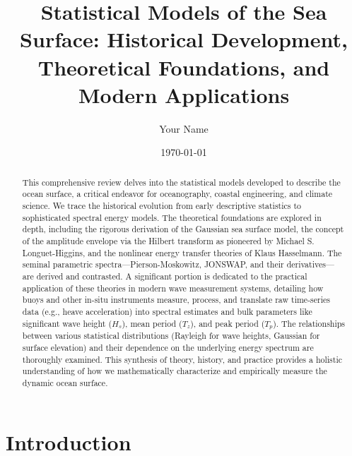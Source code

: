 \documentclass[12pt]{article}
\title{Statistical Models of the Sea Surface: Historical Development, Theoretical Foundations, and Modern Applications}
\author{Your Name}
\date{\today}
\begin{document}
\maketitle

\begin{abstract}
This comprehensive review delves into the statistical models developed to describe the ocean surface, a critical endeavor for oceanography, coastal engineering, and climate science. We trace the historical evolution from early descriptive statistics to sophisticated spectral energy models. The theoretical foundations are explored in depth, including the rigorous derivation of the Gaussian sea surface model, the concept of the amplitude envelope via the Hilbert transform as pioneered by Michael S. Longuet-Higgins, and the nonlinear energy transfer theories of Klaus Hasselmann. The seminal parametric spectra—Pierson-Moskowitz, JONSWAP, and their derivatives—are derived and contrasted. A significant portion is dedicated to the practical application of these theories in modern wave measurement systems, detailing how buoys and other in-situ instruments measure, process, and translate raw time-series data (e.g., heave acceleration) into spectral estimates and bulk parameters like significant wave height ($H_s$), mean period ($T_z$), and peak period ($T_p$). The relationships between various statistical distributions (Rayleigh for wave heights, Gaussian for surface elevation) and their dependence on the underlying energy spectrum are thoroughly examined. This synthesis of theory, history, and practice provides a holistic understanding of how we mathematically characterize and empirically measure the dynamic ocean surface.
\end{abstract}

\tableofcontents
\newpage

\section{Introduction}
\end{document}
